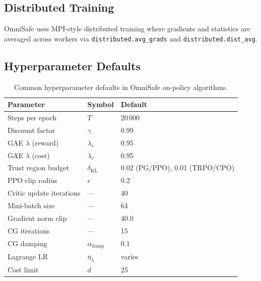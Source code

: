 \documentclass[12pt,a4paper]{article}
\theoremstyle{definition}
\newcommand{\lagm}{\lambda}
\begin{document}
\subsection{Distributed Training}

OmniSafe uses MPI-style distributed training where gradients and statistics are averaged
across workers via \texttt{distributed.avg\_grads} and \texttt{distributed.dist\_avg}.

\subsection{Hyperparameter Defaults}

\begin{table}[h]
\centering
\caption{Common hyperparameter defaults in OmniSafe on-policy algorithms.}
\label{tab:hyperparams}
\small
\begin{tabular}{lll}
\toprule
\textbf{Parameter} & \textbf{Symbol} & \textbf{Default} \\
\midrule
Steps per epoch & $T$ & 20\,000 \\
Discount factor & $\gamma$ & 0.99 \\
GAE $\lambda$ (reward) & $\lambda_r$ & 0.95 \\
GAE $\lambda$ (cost) & $\lambda_c$ & 0.95 \\
Trust region budget & $\delta_{\mathrm{KL}}$ & 0.02 (PG/PPO), 0.01 (TRPO/CPO) \\
PPO clip radius & $\epsilon$ & 0.2 \\
Critic update iterations & --- & 40 \\
Mini-batch size & --- & 64 \\
Gradient norm clip & --- & 40.0 \\
CG iterations & --- & 15 \\
CG damping & $\alpha_{\mathrm{damp}}$ & 0.1 \\
Lagrange LR & $\eta_\lagm$ & varies \\
Cost limit & $d$ & 25 \\
\bottomrule
\end{tabular}
\end{table}
\end{document}
